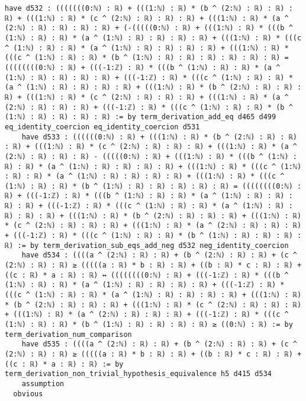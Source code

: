 \documentclass{article}
\begin{document}
\begin{tcolorbox}[colback=white!10, width=\linewidth]
\begin{lstlisting}[language=Lean4]
    have d532 : (((((((0:ℕ) : ℝ) + (((1:ℕ) : ℝ) * (b ^ (2:ℕ) : ℝ) : ℝ) : ℝ) + (((1:ℕ) : ℝ) * (c ^ (2:ℕ) : ℝ) : ℝ) : ℝ) + (((1:ℕ) : ℝ) * (a ^ (2:ℕ) : ℝ) : ℝ) : ℝ) : ℝ) + (-(((((0:ℕ) : ℝ) + (((1:ℕ) : ℝ) * (((b ^ (1:ℕ) : ℝ) : ℝ) * (a ^ (1:ℕ) : ℝ) : ℝ) : ℝ) : ℝ) + (((1:ℕ) : ℝ) * (((c ^ (1:ℕ) : ℝ) : ℝ) * (a ^ (1:ℕ) : ℝ) : ℝ) : ℝ) : ℝ) + (((1:ℕ) : ℝ) * (((c ^ (1:ℕ) : ℝ) : ℝ) * (b ^ (1:ℕ) : ℝ) : ℝ) : ℝ) : ℝ) : ℝ) : ℝ) = ((((((((0:ℕ) : ℝ) + (((-1:ℤ) : ℝ) * (((b ^ (1:ℕ) : ℝ) : ℝ) * (a ^ (1:ℕ) : ℝ) : ℝ) : ℝ) : ℝ) + (((-1:ℤ) : ℝ) * (((c ^ (1:ℕ) : ℝ) : ℝ) * (a ^ (1:ℕ) : ℝ) : ℝ) : ℝ) : ℝ) + (((1:ℕ) : ℝ) * (b ^ (2:ℕ) : ℝ) : ℝ) : ℝ) + (((1:ℕ) : ℝ) * (c ^ (2:ℕ) : ℝ) : ℝ) : ℝ) + (((1:ℕ) : ℝ) * (a ^ (2:ℕ) : ℝ) : ℝ) : ℝ) + (((-1:ℤ) : ℝ) * (((c ^ (1:ℕ) : ℝ) : ℝ) * (b ^ (1:ℕ) : ℝ) : ℝ) : ℝ) : ℝ) := by term_derivation_add_eq d465 d499 eq_identity_coercion eq_identity_coercion d531
    have d533 : ((((((0:ℕ) : ℝ) + (((1:ℕ) : ℝ) * (b ^ (2:ℕ) : ℝ) : ℝ) : ℝ) + (((1:ℕ) : ℝ) * (c ^ (2:ℕ) : ℝ) : ℝ) : ℝ) + (((1:ℕ) : ℝ) * (a ^ (2:ℕ) : ℝ) : ℝ) : ℝ) - (((((0:ℕ) : ℝ) + (((1:ℕ) : ℝ) * (((b ^ (1:ℕ) : ℝ) : ℝ) * (a ^ (1:ℕ) : ℝ) : ℝ) : ℝ) : ℝ) + (((1:ℕ) : ℝ) * (((c ^ (1:ℕ) : ℝ) : ℝ) * (a ^ (1:ℕ) : ℝ) : ℝ) : ℝ) : ℝ) + (((1:ℕ) : ℝ) * (((c ^ (1:ℕ) : ℝ) : ℝ) * (b ^ (1:ℕ) : ℝ) : ℝ) : ℝ) : ℝ) : ℝ) = ((((((((0:ℕ) : ℝ) + (((-1:ℤ) : ℝ) * (((b ^ (1:ℕ) : ℝ) : ℝ) * (a ^ (1:ℕ) : ℝ) : ℝ) : ℝ) : ℝ) + (((-1:ℤ) : ℝ) * (((c ^ (1:ℕ) : ℝ) : ℝ) * (a ^ (1:ℕ) : ℝ) : ℝ) : ℝ) : ℝ) + (((1:ℕ) : ℝ) * (b ^ (2:ℕ) : ℝ) : ℝ) : ℝ) + (((1:ℕ) : ℝ) * (c ^ (2:ℕ) : ℝ) : ℝ) : ℝ) + (((1:ℕ) : ℝ) * (a ^ (2:ℕ) : ℝ) : ℝ) : ℝ) + (((-1:ℤ) : ℝ) * (((c ^ (1:ℕ) : ℝ) : ℝ) * (b ^ (1:ℕ) : ℝ) : ℝ) : ℝ) : ℝ) := by term_derivation_sub_eqs_add_neg d532 neg_identity_coercion
    have d534 : ((((a ^ (2:ℕ) : ℝ) : ℝ) + (b ^ (2:ℕ) : ℝ) : ℝ) + (c ^ (2:ℕ) : ℝ) : ℝ) ≥ (((((a : ℝ) * b : ℝ) : ℝ) + ((b : ℝ) * c : ℝ) : ℝ) + ((c : ℝ) * a : ℝ) : ℝ) ↔ ((((((((0:ℕ) : ℝ) + (((-1:ℤ) : ℝ) * (((b ^ (1:ℕ) : ℝ) : ℝ) * (a ^ (1:ℕ) : ℝ) : ℝ) : ℝ) : ℝ) + (((-1:ℤ) : ℝ) * (((c ^ (1:ℕ) : ℝ) : ℝ) * (a ^ (1:ℕ) : ℝ) : ℝ) : ℝ) : ℝ) + (((1:ℕ) : ℝ) * (b ^ (2:ℕ) : ℝ) : ℝ) : ℝ) + (((1:ℕ) : ℝ) * (c ^ (2:ℕ) : ℝ) : ℝ) : ℝ) + (((1:ℕ) : ℝ) * (a ^ (2:ℕ) : ℝ) : ℝ) : ℝ) + (((-1:ℤ) : ℝ) * (((c ^ (1:ℕ) : ℝ) : ℝ) * (b ^ (1:ℕ) : ℝ) : ℝ) : ℝ) : ℝ) ≥ ((0:ℕ) : ℝ) := by term_derivation_num_comparison
    have d535 : ((((a ^ (2:ℕ) : ℝ) : ℝ) + (b ^ (2:ℕ) : ℝ) : ℝ) + (c ^ (2:ℕ) : ℝ) : ℝ) ≥ (((((a : ℝ) * b : ℝ) : ℝ) + ((b : ℝ) * c : ℝ) : ℝ) + ((c : ℝ) * a : ℝ) : ℝ) := by term_derivation_non_trivial_hypothesis_equivalence h5 d415 d534
    assumption
  obvious

\end{lstlisting}
\end{tcolorbox}
\end{document}
